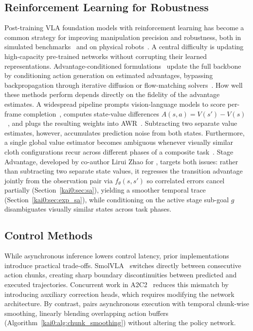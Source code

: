 \subsection{Reinforcement Learning for Robustness}\label{kai0:app:related_rl}
Post-training VLA foundation models with reinforcement learning has become a common strategy for improving manipulation precision and robustness, both in simulated benchmarks~\cite{liu2023libero,mu2025robotwin,mees2022calvin,lu2025vla,li2025simplevla,chen2025tgrpo} and on physical robots~\cite{luo2025hilserl,xiao2025PLD,luo2024serl}. A central difficulty is updating high-capacity pre-trained networks without corrupting their learned representations. Advantage-conditioned formulations~\cite{amin2026pistar06,frans2025diffusion,kumar2019reward} update the full backbone by conditioning action generation on estimated advantages, bypassing backpropagation through iterative diffusion or flow-matching solvers~\cite{lei2025rl}. How well these methods perform depends directly on the fidelity of the advantage estimates. A widespread pipeline prompts vision-language models to score per-frame completion~\cite{ma2024gvl,zhang2025rewind,zhai2025vlac,ghasemipour2025self}, computes state-value differences $A(s,a) = V(s') - V(s)$~\cite{amin2026pistar06}, and plugs the resulting weights into AWR~\cite{wu2023elastic,kuba2023advantage}. Subtracting two separate value estimates, however, accumulates prediction noise from both states. Furthermore, a single global value estimator becomes ambiguous whenever visually similar cloth configurations recur across different phases of a composite task~\cite{amin2026pistar06,li2025gr}. Stage Advantage, developed by co-author Lirui Zhao for \chiz, targets both issues: rather than subtracting two separate state values, it regresses the transition advantage jointly from the observation pair via $f_{\theta}(s, s')$ so correlated errors cancel partially (Section~\ref{kai0:sec:sa}), yielding a smoother temporal trace (Section~\ref{kai0:sec:exp_sa}), while conditioning on the active stage sub-goal $g$ disambiguates visually similar states across task phases.

\subsection{Control Methods}\label{kai0:app:related_control}
While asynchronous inference lowers control latency, prior implementations introduce practical trade-offs. SmolVLA~\cite{shukor2025smolvla} switches directly between consecutive action chunks, creating sharp boundary discontinuities between predicted and executed trajectories. Concurrent work in A2C2~\cite{sendai2025leave} reduces this mismatch by introducing auxiliary correction heads, which requires modifying the network architecture. By contrast, \chiz pairs asynchronous execution with temporal chunk-wise smoothing, linearly blending overlapping action buffers (Algorithm~\ref{kai0:alg:chunk_smoothing}) without altering the policy network.

